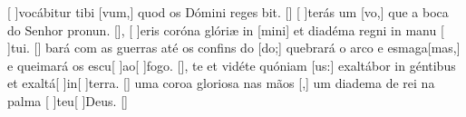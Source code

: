 {  %
  {[ ]{vo}cábitur tibi [vum,] quod os Dómini reges bit. [\LinkLA]}%
    {[ ]{te}rás um [vo,] que a boca do Senhor pronun. [\LinkPT]},
  {[ ]{e}ris coróna glóriæ in [mini] et diadéma regni in manu [ ]{tu}i. [\LinkLA]}%
    {bará com as guerras até os confins do [do;] quebrará o arco e esmaga[mas,] e queimará os escu[ ]{ao}[ ]{fo}go. [\LinkPT]},
  {te et vidéte quóniam [us:] exaltábor in géntibus et exaltá[ ]{in}[ ]{ter}ra. [\LinkLA]}%
    { uma coroa gloriosa nas mãos [,] um diadema de rei na palma [ ]{teu}[ ]{Deus}. [\LinkPT]}
}